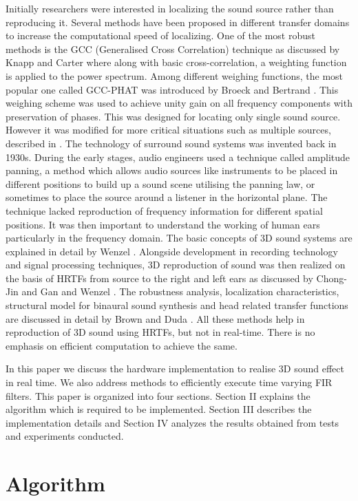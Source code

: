 \documentclass[conference]{IEEEtran}
\begin{document}
Initially researchers were interested in localizing the sound source rather than reproducing it. Several methods have been proposed in different transfer domains to increase the computational speed of localizing. One of the most robust methods is the GCC (Generalised Cross Correlation) technique as discussed by Knapp and Carter \cite{two} where along with basic cross-correlation, a weighting function is applied to the power spectrum. Among different weighing functions, the most popular one called GCC-PHAT was introduced by Broeck and Bertrand \cite{one}. This weighing scheme was used to achieve unity gain on all frequency components with preservation of phases.  This was designed for locating only single sound source. However it was modified for more critical situations such as multiple sources, described in \cite{three}. The technology of surround sound systems was invented back in 1930s. During the early stages, audio engineers used a technique called amplitude panning, a method which allows audio sources like instruments to be placed in different positions to build up a sound scene utilising the panning law, or sometimes to place the source around a listener in the horizontal plane. The technique lacked reproduction of frequency information for different spatial positions. It was then important to understand the working of human ears particularly in the frequency domain. The basic concepts of 3D sound systems are explained in detail by Wenzel \cite{four}. Alongside development in recording technology and signal processing techniques, 3D reproduction of sound was then realized on the basis of HRTFs from source to the right and left ears as discussed by Chong-Jin and Gan \cite{six} and Wenzel \cite{four}. The  robustness  analysis,  localization  characteristics,  structural  model  for  binaural  sound  synthesis  and  head related transfer functions are discussed in detail by Brown and Duda \cite{seven}. All these methods help in reproduction of 3D sound using HRTFs, but not in real-time. There is no emphasis on efficient computation to achieve the same.  

In this paper we discuss the hardware implementation to realise 3D sound effect in real time. We also address methods to efficiently execute time varying FIR filters. This paper is organized into four sections. Section II explains the algorithm which is required to be implemented. Section III describes the implementation details and Section IV analyzes the results obtained from tests and experiments conducted.  


\section{Algorithm}
\end{document}
